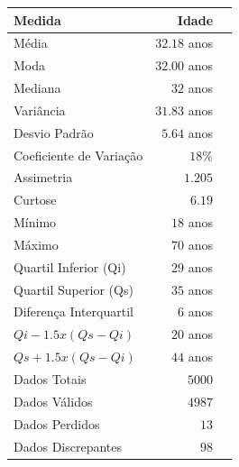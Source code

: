 \documentclass[10pt,a4paper,oneside]{article}
\begin{document}
\begin{figure}[h]
\centering
\begin{minipage}{0.52\textwidth}
\centering
\small
{}
\vspace{0.5em}
\label{table: medidas sintese idade}
\begin{tabular}{l r r}
	\toprule
	\textbf{Medida}               & \textbf{Idade} \\
	\midrule
	Média                         & $32.18$ anos   \\
	Moda                          & $32.00$ anos   \\
	Mediana                       & $32$ anos      \\
	Variância                     & $31.83$ anos   \\
	Desvio Padrão                 & $5.64$ anos    \\
	Coeficiente de Variação       & $18 \%$        \\
	Assimetria                    & $1.205$        \\
	Curtose                       & $6.19$         \\
	Mínimo                        & $18$ anos      \\
	Máximo                        & $70$ anos      \\
	Quartil Inferior (Qi)         & $29$ anos      \\
	Quartil Superior (Qs)         & $35$ anos      \\
	Diferença Interquartil        & $6$  anos      \\
	$Qi-1.5x(Qs-Qi)$              & $20$ anos      \\
	$Qs+1.5x(Qs-Qi)$              & $44$ anos      \\
	Dados Totais                  & $5000$         \\
	Dados Válidos                 & $4987$         \\
	Dados Perdidos                & $13$           \\
	Dados Discrepantes            & $98$           \\
	\bottomrule
\end{tabular}
\end{minipage}
%
\begin{minipage}{0.46\textwidth}
	\centering

\end{minipage}
\end{figure}
\end{document}
